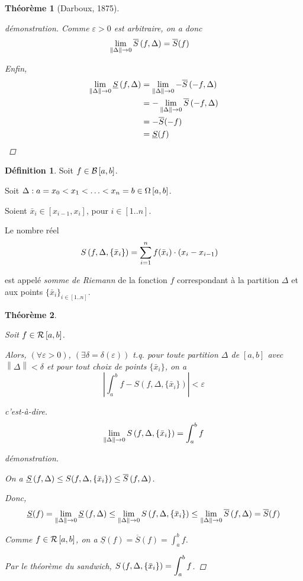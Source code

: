 \documentclass{report}
\newcommand*{\Ssup}[1]{\overline{S}(#1)}
\newcommand*{\Sinf}[1]{\underline{S}(#1)}
\newcommand*{\norme}[1]{\left\| #1 \right\|}
\newcommand*{\abs}[1]{\left| #1 \right|}
\newcommand*{\eps}{\varepsilon}
\newtheorem*{thm}{Th\'eor\`eme}
\theoremstyle{definition}
\newtheorem*{defin}{D\'efinition}
\theoremstyle{remark}
\begin{document}
\begin{thm}[Darboux, 1875]
\begin{proof}[d\'emonstration]
			Comme $\eps>0$ est arbitraire, on a donc
			\begin{align*}
				\lim\limits_{\norme{\Delta} \to 0}\ssup{f}&= \Ssup{f}
			\end{align*}

			Enfin,
			\begin{align*}
				\lim\limits_{\norme{\Delta} \to 0} \sinf{f}&= \lim\limits_{\norme{\Delta} \to 0} -\ssup{-f}\\
				&= -\lim\limits_{\norme{\Delta} \to 0} \ssup{-f}\\
				&= -\Ssup{-f}\\
				&= \Sinf{f}
			\end{align*}
		\end{proof}
	\end{thm}

	\begin{defin}


		Soit $f \in \bornee$.

		Soit $\Delta : a=x_0 < x_1 < \dotsc < x_n=b \in \partitions$.

		Soient $\bar{x}_i \in [x_{i-1},x_i]$, pour $i \in [1..n]$.

		Le nombre r\'eel
		\begin{align*}
			\srie{f}&= \sum_{i=1}^{n}f(\bar{x}_i) \cdot (x_i-x_{i-1})
		\end{align*}

		est appel\'e \emph{somme de Riemann} de la fonction $f$ correspondant \`a la partition $\Delta$ et aux points $\{\bar{x}_i\}_{i \in [1..n]}$.
	\end{defin}

	\begin{thm}
		~

		Soit $f \in \riemann$.

		Alors, $(\forall\eps>0)$, $(\exists\delta=\delta(\eps))$ t.q. pour toute partition $\Delta$ de $[a,b]$ avec $\norme{\Delta}<\delta$ et pour tout choix de points $\{\bar{x}_i\}$, on a
		\[
		\abs{\int_{a}^{b}f - S(f, \Delta, \{\bar{x}_i\})} < \eps
		\]

		c'est-\`a-dire.
		\[
		\lim_{\norme{\Delta} \to 0}\srie{f} = \int_{a}^{b}f
		\]
		\begin{proof}[d\'emonstration]~

			On a $\sinf{f} \leq S(f, \Delta, \{\bar{x}_i\}) \leq \ssup{f}$.

			Donc,
			\[
			\Sinf{f} = \lim_{\norme{\Delta} \to 0}\sinf{f} \leq \lim_{\norme{\Delta} \to 0}\srie{f} \leq \lim_{\norme{\Delta} \to 0}\ssup{f} = \Ssup{f}
			\]

			Comme $f \in \riemann$, on a $\Sinf{f} = \Ssup{f} = \displaystyle\int_{a}^{b}f$.

			Par le th\'eor\`eme du sandwich, $\srie{f} = \displaystyle\int_a^bf$.
		\end{proof}
	\end{thm}
\end{document}
